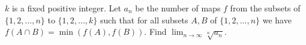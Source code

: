 $k$ is a fixed positive integer. Let $a_n$ be the number of maps $f$ from the subsets of $\{1, 2, ... , n\}$ to $\{1, 2, ... , k\}$ such that for all subsets $A, B$ of $\{1, 2, ... , n\}$ we have $f(A \cap B) = \min (f(A), f(B))$. Find $\lim_{n \to \infty} \sqrt[n]{a_n}$.